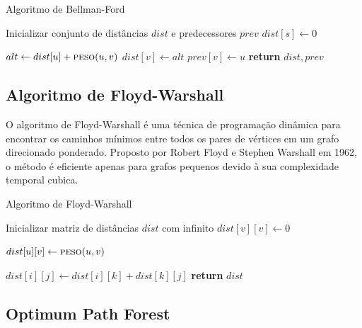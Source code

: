 \documentclass[12pt]{article}
\begin{document}
\begin{algorithm}
\caption{Algoritmo de Bellman-Ford}
\begin{algorithmic}[1]
  \State Inicializar conjunto de distâncias $dist$ e predecessores $prev$
  \State $dist[s] \gets 0$

      \State $alt \gets dist[u] + \textproc{peso}(u, v)$
        \State $dist[v] \gets alt$
        \State $prev[v] \gets u$
      \EndIf
    \EndFor
  \EndFor
  \State \textbf{return} $dist, prev$
\EndProcedure
\end{algorithmic}
\end{algorithm}

\subsection{Algoritmo de Floyd-Warshall}

O algoritmo de Floyd-Warshall é uma técnica de programação dinâmica para encontrar os caminhos mínimos entre todos os pares de vértices em um grafo direcionado ponderado. Proposto por Robert Floyd e Stephen Warshall em 1962, o método é eficiente apenas para grafos pequenos devido à sua complexidade temporal cubica.

\begin{algorithm}[H]
\caption{Algoritmo de Floyd-Warshall}
\begin{algorithmic}[1]
  \State Inicializar matriz de distâncias $dist$ com infinito
    \State $dist[v][v] \gets 0$
  \EndFor

    \State $dist[u][v] \gets \textproc{peso}(u, v)$
  \EndFor

          \State $dist[i][j] \gets dist[i][k] + dist[k][j]$
        \EndIf
      \EndFor
    \EndFor
  \EndFor
  \State \textbf{return} $dist$
\EndProcedure
\end{algorithmic}
\end{algorithm}

\subsection{Optimum Path Forest}
\end{document}
